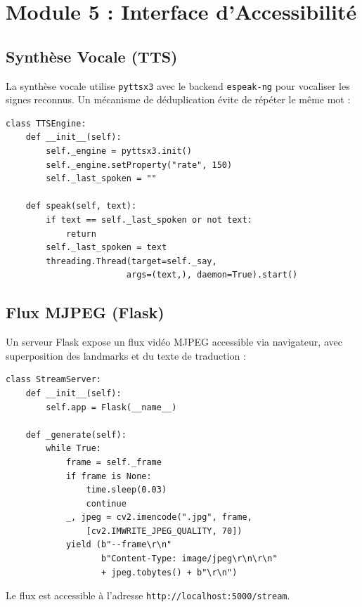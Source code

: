 \section{Module 5 : Interface d'Accessibilité}

\subsection{Synthèse Vocale (TTS)}

La synthèse vocale utilise \texttt{pyttsx3} avec le backend \texttt{espeak-ng} pour vocaliser les signes reconnus. Un mécanisme de déduplication évite de répéter le même mot :

\begin{lstlisting}[style=python, caption={Synthèse vocale threadée}]
class TTSEngine:
    def __init__(self):
        self._engine = pyttsx3.init()
        self._engine.setProperty("rate", 150)
        self._last_spoken = ""

    def speak(self, text):
        if text == self._last_spoken or not text:
            return
        self._last_spoken = text
        threading.Thread(target=self._say,
                        args=(text,), daemon=True).start()
\end{lstlisting}

\subsection{Flux MJPEG (Flask)}

Un serveur Flask expose un flux vidéo MJPEG accessible via navigateur, avec superposition des landmarks et du texte de traduction :

\begin{lstlisting}[style=python, caption={Serveur Flask MJPEG}]
class StreamServer:
    def __init__(self):
        self.app = Flask(__name__)

    def _generate(self):
        while True:
            frame = self._frame
            if frame is None:
                time.sleep(0.03)
                continue
            _, jpeg = cv2.imencode(".jpg", frame,
                [cv2.IMWRITE_JPEG_QUALITY, 70])
            yield (b"--frame\r\n"
                   b"Content-Type: image/jpeg\r\n\r\n"
                   + jpeg.tobytes() + b"\r\n")
\end{lstlisting}

Le flux est accessible à l'adresse \texttt{http://localhost:5000/stream}.

